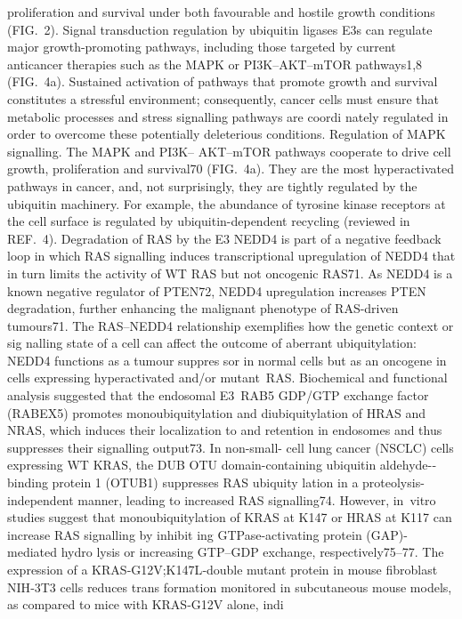 proliferation and survival under both favourable and
hostile growth conditions (FIG. 2).
Signal transduction regulation by ubiquitin ligases
E3s can regulate major growth-promoting pathways,
including those targeted by current anticancer therapies
such as the MAPK or PI3K–AKT–mTOR pathways1,8
(FIG. 4a). Sustained activation of pathways that promote
growth and survival constitutes a stressful environment;
consequently, cancer cells must ensure that metabolic
processes and stress signalling pathways are coordi­
nately regulated in order to overcome these potentially
­deleterious conditions.
Regulation of MAPK signalling. The MAPK and PI3K–
AKT–mTOR pathways cooperate to drive cell growth,
proliferation and survival70 (FIG. 4a). They are the most
hyperactivated pathways in cancer, and, not surprisingly,
they are tightly regulated by the ubiquitin machinery.
For example, the abundance of tyrosine kinase receptors
at the cell surface is regulated by ubiquitin-dependent
recycling (reviewed in REF. 4). Degradation of RAS by the
E3 NEDD4 is part of a negative feedback loop in which
RAS signalling induces transcriptional upregulation of
NEDD4 that in turn limits the activity of WT RAS but
not oncogenic RAS71. As NEDD4 is a known negative
regulator of PTEN72, NEDD4 upregulation increases
PTEN degradation, further enhancing the malignant
phenotype of RAS-driven tumours71. The RAS–NEDD4
relationship exemplifies how the genetic context or sig­
nalling state of a cell can affect the outcome of aberrant
ubiquitylation: NEDD4 functions as a tumour suppres­
sor in normal cells but as an oncogene in cells expressing
hyperactivated and/or mutant RAS.
Biochemical and functional analysis suggested
that the endosomal E3 RAB5 GDP/GTP exchange
factor (RABEX5) promotes monoubiquitylation and
diubiquity­lation of HRAS and NRAS, which induces
their localization to and retention in endosomes and
thus suppresses their signalling output73. In non-small-
cell lung cancer (NSCLC) cells expressing WT KRAS,
the DUB OTU domain-containing ubiquitin aldehyde-­
binding protein 1 (OTUB1) suppresses RAS ubiquity­
lation in a proteolysis-independent manner, leading to
increased RAS signalling74. However, in vitro studies
suggest that monoubiquitylation of KRAS at K147 or
HRAS at K117 can increase RAS signalling by inhibit­
ing GTPase-activating protein (GAP)-mediated hydro­
lysis or increasing GTP–GDP exchange, respectively75–77.
The expression of a KRAS‑G12V;K147L‑double mutant
protein in mouse fibroblast NIH‑3T3 cells reduces trans­
formation monitored in subcutaneous mouse models,
as compared to mice with KRAS‑G12V alone, indi­
